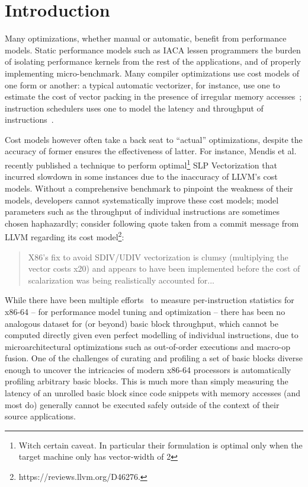 \section{Introduction}
Many optimizations, whether manual or automatic,
benefit from performance models.
Static performance models such as IACA lessen programmers
the burden of isolating performance kernels from
the rest of the applications,
and of properly implementing micro-benchmark. Many compiler optimizations
use cost models of one form or another:
a typical automatic vectorizer, for instance,
use one to estimate the cost of vector packing
in the presence of irregular memory accesses~\cite{goslp};
instruction schedulers uses one to model the latency
and throughput of instructions~\cite{llvm-sched,gcc-sched}.

Cost models however often take a back seat to “actual” optimizations,
despite the accuracy of former ensures the effectiveness of latter.
For instance, Mendis et al.\cite{goslp}
recently published a technique to perform optimal\footnote{
Witch certain caveat.
In particular their formulation is optimal
only when the target machine only has vector-width of 2}
SLP Vectorization\cite{slp} that
incurred slowdown in some instances due to the inaccuracy of 
LLVM's cost models.
Without a comprehensive benchmark to pinpoint the weakness of their models,
developers cannot systematically improve these cost models;
model parameters
such as the throughput of individual instructions
are sometimes chosen haphazardly;
consider following quote taken from a commit message from LLVM\cite{llvm}
regarding its cost model\footnote{
https://reviews.llvm.org/D46276.
}:
\begin{quote}
X86's fix to avoid SDIV/UDIV vectorization is clumsy
(multiplying the vector costs x20)
and appears to have been implemented before the cost of
scalarization was being realistically accounted for...
\end{quote}

While there have been multiple efforts~\cite{agner,uops,exegesis} to measure per-instruction
statistics for x86-64 -- for performance model tuning and optimization --
there has been no analogous dataset for (or beyond) basic block throughput,
which cannot be computed directly given even perfect modelling of individual instructions,
due to microarchitectural optimizations such as out-of-order executions and macro-op fusion.
One of the challenges of curating and profiling a set of basic blocks diverse enough to
uncover the intricacies of modern x86-64 processors is automatically profiling arbitrary
basic blocks.
This is much more than simply measuring the latency of an unrolled basic block
since code snippets with memory accesses (and most do)
generally cannot be executed safely
outside of the context of their source applications.


